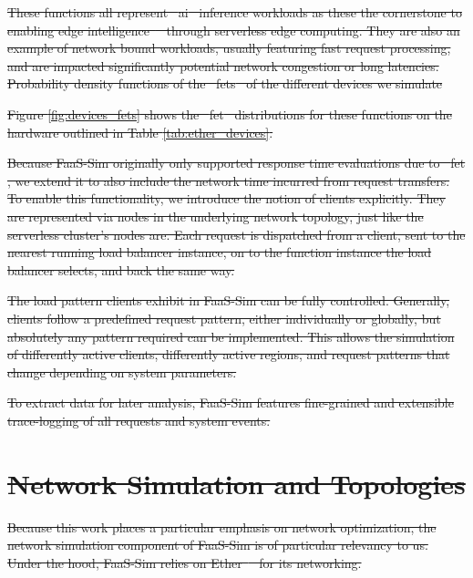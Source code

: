 \documentclass[draft,final]{vutinfth} %
\providecommand{\DIFdeltex}[1]{{\protect\color{red}\sout{#1}}}                      %
\providecommand{\DIFdelFL}[1]{\DIFdel{#1}} %
\providecommand{\DIFdel}[1]{\texorpdfstring{\DIFdeltex{#1}}{}} %
\begin{document}
\DIFdel{These functions all represent \mbox{%
\gls{ai} }\hskip0pt%
inference workloads as these the cornerstone to enabling edge intelligence\mbox{%
\cite{rauschEdgeIntelligenceConvergence2019} }\hskip0pt%
through serverless edge computing.
They are also an example of network bound workloads, usually featuring fast request processing, and are impacted significantly potential network congestion or long latencies.
}%
{%
\DIFdelFL{Probability density functions of the \mbox{%
\glspl{fet} }\hskip0pt%
of the different devices we simulate}}

\DIFdel{Figure \ref{fig:devices_fets}
shows the \mbox{%
\gls{fet} }\hskip0pt%
distributions for these functions on the hardware outlined in Table \ref{tab:ether_devices}.
}%

\DIFdel{Because FaaS-Sim originally only supported response time evaluations due to \mbox{%
\gls{fet}}\hskip0pt%
, we extend it to also include the network time incurred from request transfers.
To enable this functionality, we introduce the notion of clients explicitly.
They are represented via nodes in the underlying network topology, just like the serverless cluster's nodes are.
Each request is dispatched from a client, sent to the nearest running load balancer instance, on to the function instance the load balancer selects, and back the same way.
}%

\DIFdel{The load pattern clients exhibit in FaaS-Sim can be fully controlled.
Generally, clients follow a predefined request pattern, either individually or globally, but absolutely any pattern required can be implemented.
This allows the simulation of differently active clients, differently active regions, and request patterns that change depending on system parameters.
}%

\DIFdel{To extract data for later analysis, FaaS-Sim features fine-grained and extensible trace-logging of all requests and system events.
}\section{\DIFdel{Network Simulation and Topologies}}
\addtocounter{section}{-1}%
\DIFdel{Because this work places a particular emphasis on network optimization, the network simulation component of FaaS-Sim is of particular relevancy to us.
Under the hood, FaaS-Sim relies on Ether\mbox{%
\cite{rausch-ether} }\hskip0pt%
for its networking.
}%
\end{document}
